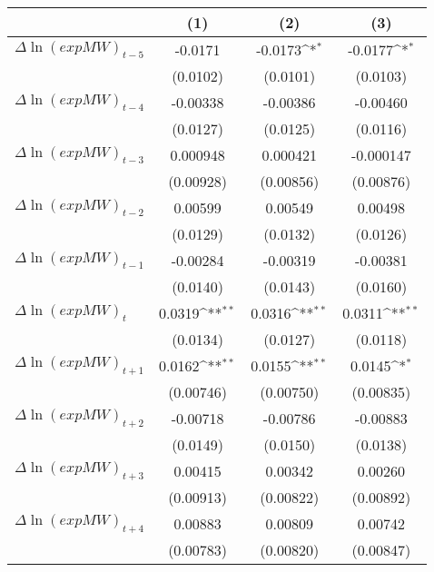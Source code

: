 {
\def\sym#1{\ifmmode^{#1}\else\(^{#1}\)\fi}
\begin{tabular}{l*{3}{c}}
\hline\hline
          &\multicolumn{1}{c}{(1)}         &\multicolumn{1}{c}{(2)}         &\multicolumn{1}{c}{(3)}         \\
\hline
$\Delta \ln(exp MW)_{t-5}$&  -0.0171         &  -0.0173\sym{*}  &  -0.0177\sym{*}  \\
          & (0.0102)         & (0.0101)         & (0.0103)         \\
[1em]
$\Delta \ln(exp MW)_{t-4}$& -0.00338         & -0.00386         & -0.00460         \\
          & (0.0127)         & (0.0125)         & (0.0116)         \\
[1em]
$\Delta \ln(exp MW)_{t-3}$& 0.000948         & 0.000421         &-0.000147         \\
          &(0.00928)         &(0.00856)         &(0.00876)         \\
[1em]
$\Delta \ln(exp MW)_{t-2}$&  0.00599         &  0.00549         &  0.00498         \\
          & (0.0129)         & (0.0132)         & (0.0126)         \\
[1em]
$\Delta \ln(exp MW)_{t-1}$& -0.00284         & -0.00319         & -0.00381         \\
          & (0.0140)         & (0.0143)         & (0.0160)         \\
[1em]
$\Delta \ln(exp MW)_{t}$&   0.0319\sym{**} &   0.0316\sym{**} &   0.0311\sym{**} \\
          & (0.0134)         & (0.0127)         & (0.0118)         \\
[1em]
$\Delta \ln(exp MW)_{t+1}$&   0.0162\sym{**} &   0.0155\sym{**} &   0.0145\sym{*}  \\
          &(0.00746)         &(0.00750)         &(0.00835)         \\
[1em]
$\Delta \ln(exp MW)_{t+2}$& -0.00718         & -0.00786         & -0.00883         \\
          & (0.0149)         & (0.0150)         & (0.0138)         \\
[1em]
$\Delta \ln(exp MW)_{t+3}$&  0.00415         &  0.00342         &  0.00260         \\
          &(0.00913)         &(0.00822)         &(0.00892)         \\
[1em]
$\Delta \ln(exp MW)_{t+4}$&  0.00883         &  0.00809         &  0.00742         \\
          &(0.00783)         &(0.00820)         &(0.00847)         \\

\end{tabular}}
